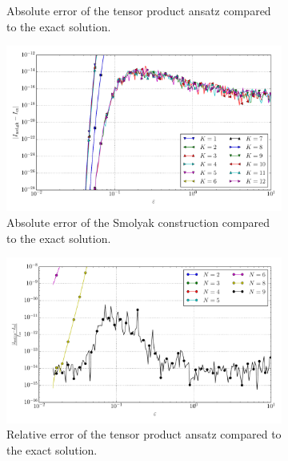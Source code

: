 \documentclass[a4paper,10pt]{article}
\begin{document}
\begin{figure}[ht!]
\begin{subfigure}[t]{0.5\linewidth}
    \caption{Absolute error of the tensor product ansatz compared to the exact solution.}
    \label{fig:tp_sg_4d_conv_p_8010_8100_err_nsd_tp}
  \end{subfigure}
  \begin{subfigure}[t]{0.5\linewidth}
    \includegraphics[width=\linewidth]{./plots/tp_sg_4d_conv_eps_(8,0,1,0)_(8,1,0,0)_err_nsd_gk.pdf}
    \caption{Absolute error of the Smolyak construction compared to the exact solution.}
    \label{fig:tp_sg_4d_conv_p_8010_8100_err_nsd_gk}
  \end{subfigure}
  \begin{subfigure}[t]{0.5\linewidth}
    \includegraphics[width=\linewidth]{./plots/tp_sg_4d_conv_eps_(8,0,1,0)_(8,1,0,0)_err_rel_nsd_tp.pdf}
    \caption{Relative error of the tensor product ansatz compared to the exact solution.}
    \label{fig:tp_sg_4d_conv_p_8010_8100_err_rel_nsd_tp}
  \end{subfigure}
  \begin{subfigure}[t]{0.5\linewidth}

\end{subfigure}
\end{figure}
\end{document}
